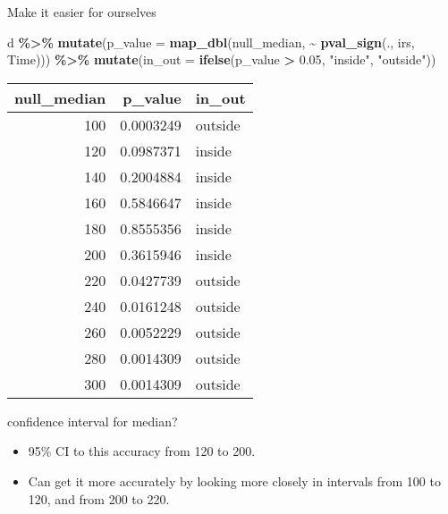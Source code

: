 \documentclass[
  ignorenonframetext,
]{beamer}
\newenvironment{Shaded}{\begin{snugshade}}{\end{snugshade}}
\newcommand{\DataTypeTok}[1]{\textcolor[rgb]{0.13,0.29,0.53}{#1}}
\newcommand{\FloatTok}[1]{\textcolor[rgb]{0.00,0.00,0.81}{#1}}
\newcommand{\KeywordTok}[1]{\textcolor[rgb]{0.13,0.29,0.53}{\textbf{#1}}}
\newcommand{\NormalTok}[1]{#1}
\newcommand{\OperatorTok}[1]{\textcolor[rgb]{0.81,0.36,0.00}{\textbf{#1}}}
\newcommand{\StringTok}[1]{\textcolor[rgb]{0.31,0.60,0.02}{#1}}
\providecommand{\tightlist}{%
  \setlength{\itemsep}{0pt}\setlength{\parskip}{0pt}}
\begin{document}
\begin{frame}[fragile]{Make it easier for ourselves}
\protect\hypertarget{make-it-easier-for-ourselves}{}
\begin{Shaded}
\begin{Highlighting}[]
\NormalTok{d }\OperatorTok{\%\textgreater{}\%}\StringTok{ }
\StringTok{  }\KeywordTok{mutate}\NormalTok{(}\DataTypeTok{p\_value =} \KeywordTok{map\_dbl}\NormalTok{(null\_median, }
                           \OperatorTok{\textasciitilde{}}\StringTok{ }\KeywordTok{pval\_sign}\NormalTok{(., irs, Time))) }\OperatorTok{\%\textgreater{}\%}
\StringTok{  }\KeywordTok{mutate}\NormalTok{(}\DataTypeTok{in\_out =} \KeywordTok{ifelse}\NormalTok{(p\_value }\OperatorTok{\textgreater{}}\StringTok{ }\FloatTok{0.05}\NormalTok{, }\StringTok{"inside"}\NormalTok{, }\StringTok{"outside"}\NormalTok{))}
\end{Highlighting}
\end{Shaded}

\begin{longtable}[]{@{}rrl@{}}
\toprule
null\_median & p\_value & in\_out\tabularnewline
\midrule
\endhead
100 & 0.0003249 & outside\tabularnewline
120 & 0.0987371 & inside\tabularnewline
140 & 0.2004884 & inside\tabularnewline
160 & 0.5846647 & inside\tabularnewline
180 & 0.8555356 & inside\tabularnewline
200 & 0.3615946 & inside\tabularnewline
220 & 0.0427739 & outside\tabularnewline
240 & 0.0161248 & outside\tabularnewline
260 & 0.0052229 & outside\tabularnewline
280 & 0.0014309 & outside\tabularnewline
300 & 0.0014309 & outside\tabularnewline
\bottomrule
\end{longtable}
\end{frame}

\begin{frame}{confidence interval for median?}
\protect\hypertarget{confidence-interval-for-median}{}
\begin{itemize}
\tightlist
\item
  95\% CI to this accuracy from 120 to 200.
\item
  Can get it more accurately by looking more closely in intervals from
  100 to 120, and from 200 to 220.
\end{itemize}
\end{frame}
\end{document}
